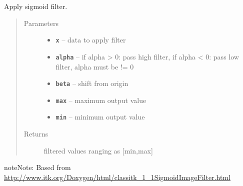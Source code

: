 \documentclass[letterpaper,10pt,english]{sphinxmanual}
\begin{document}

\begin{fulllineitems}
\label{RRtoolbox.lib.arrayops:RRtoolbox.lib.arrayops.filters.sigmoid}
Apply sigmoid filter.
\begin{quote}\begin{description}
\item[{Parameters}] \leavevmode\begin{itemize}
\item {} 
\textbf{\texttt{x}} -- data to apply filter

\item {} 
\textbf{\texttt{alpha}} -- if alpha \textgreater{} 0: pass high filter, if alpha \textless{} 0: pass low filter, alpha must be != 0

\item {} 
\textbf{\texttt{beta}} -- shift from origin

\item {} 
\textbf{\texttt{max}} -- maximum output value

\item {} 
\textbf{\texttt{min}} -- minimum output value

\end{itemize}

\item[{Returns}] \leavevmode
filtered values ranging as {[}min,max{]}

\end{description}\end{quote}

\begin{notice}{note}{Note:}
Based from \href{http://www.itk.org/Doxygen/html/classitk\_1\_1SigmoidImageFilter.html}{http://www.itk.org/Doxygen/html/classitk\_1\_1SigmoidImageFilter.html}
\end{notice}

\end{fulllineitems}

\end{document}
